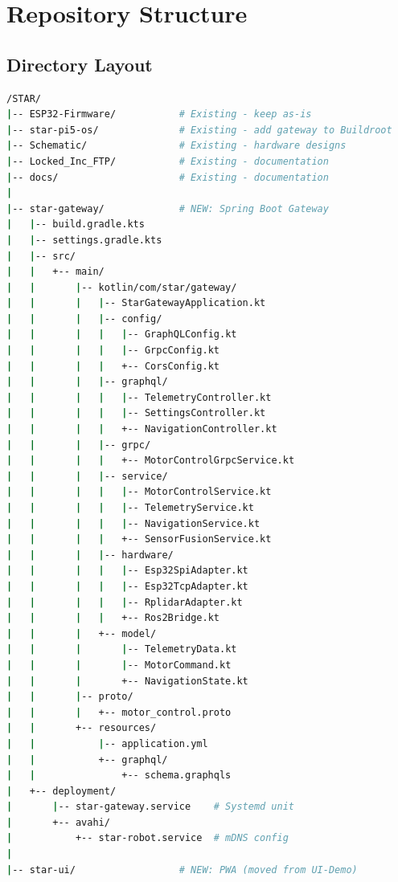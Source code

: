 \section{Repository Structure}

\subsection{Directory Layout}

\begin{lstlisting}[language=bash, caption=Complete Repository Structure]
/STAR/
|-- ESP32-Firmware/           # Existing - keep as-is
|-- star-pi5-os/              # Existing - add gateway to Buildroot
|-- Schematic/                # Existing - hardware designs
|-- Locked_Inc_FTP/           # Existing - documentation
|-- docs/                     # Existing - documentation
|
|-- star-gateway/             # NEW: Spring Boot Gateway
|   |-- build.gradle.kts
|   |-- settings.gradle.kts
|   |-- src/
|   |   +-- main/
|   |       |-- kotlin/com/star/gateway/
|   |       |   |-- StarGatewayApplication.kt
|   |       |   |-- config/
|   |       |   |   |-- GraphQLConfig.kt
|   |       |   |   |-- GrpcConfig.kt
|   |       |   |   +-- CorsConfig.kt
|   |       |   |-- graphql/
|   |       |   |   |-- TelemetryController.kt
|   |       |   |   |-- SettingsController.kt
|   |       |   |   +-- NavigationController.kt
|   |       |   |-- grpc/
|   |       |   |   +-- MotorControlGrpcService.kt
|   |       |   |-- service/
|   |       |   |   |-- MotorControlService.kt
|   |       |   |   |-- TelemetryService.kt
|   |       |   |   |-- NavigationService.kt
|   |       |   |   +-- SensorFusionService.kt
|   |       |   |-- hardware/
|   |       |   |   |-- Esp32SpiAdapter.kt
|   |       |   |   |-- Esp32TcpAdapter.kt
|   |       |   |   |-- RplidarAdapter.kt
|   |       |   |   +-- Ros2Bridge.kt
|   |       |   +-- model/
|   |       |       |-- TelemetryData.kt
|   |       |       |-- MotorCommand.kt
|   |       |       +-- NavigationState.kt
|   |       |-- proto/
|   |       |   +-- motor_control.proto
|   |       +-- resources/
|   |           |-- application.yml
|   |           +-- graphql/
|   |               +-- schema.graphqls
|   +-- deployment/
|       |-- star-gateway.service    # Systemd unit
|       +-- avahi/
|           +-- star-robot.service  # mDNS config
|
|-- star-ui/                  # NEW: PWA (moved from UI-Demo)

\end{lstlisting}

